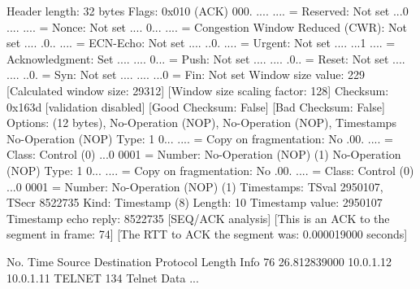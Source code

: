     Header length: 32 bytes
    Flags: 0x010 (ACK)
        000. .... .... = Reserved: Not set
        ...0 .... .... = Nonce: Not set
        .... 0... .... = Congestion Window Reduced (CWR): Not set
        .... .0.. .... = ECN-Echo: Not set
        .... ..0. .... = Urgent: Not set
        .... ...1 .... = Acknowledgment: Set
        .... .... 0... = Push: Not set
        .... .... .0.. = Reset: Not set
        .... .... ..0. = Syn: Not set
        .... .... ...0 = Fin: Not set
    Window size value: 229
    [Calculated window size: 29312]
    [Window size scaling factor: 128]
    Checksum: 0x163d [validation disabled]
        [Good Checksum: False]
        [Bad Checksum: False]
    Options: (12 bytes), No-Operation (NOP), No-Operation (NOP), Timestamps
        No-Operation (NOP)
            Type: 1
                0... .... = Copy on fragmentation: No
                .00. .... = Class: Control (0)
                ...0 0001 = Number: No-Operation (NOP) (1)
        No-Operation (NOP)
            Type: 1
                0... .... = Copy on fragmentation: No
                .00. .... = Class: Control (0)
                ...0 0001 = Number: No-Operation (NOP) (1)
        Timestamps: TSval 2950107, TSecr 8522735
            Kind: Timestamp (8)
            Length: 10
            Timestamp value: 2950107
            Timestamp echo reply: 8522735
    [SEQ/ACK analysis]
        [This is an ACK to the segment in frame: 74]
        [The RTT to ACK the segment was: 0.000019000 seconds]

No.     Time           Source                Destination           Protocol Length Info
     76 26.812839000   10.0.1.12             10.0.1.11             TELNET   134    Telnet Data ...

